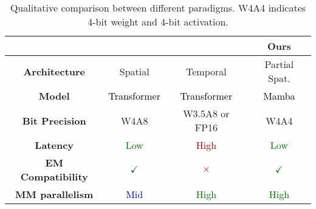 \begin{table}[!t]
\centering
\caption{Qualitative comparison between different paradigms. W4A4 indicates 4-bit weight and 4-bit activation.}
\label{tab:Qualitative comparison}
\begin{tabular}{c|c|c|c}
\toprule
 & \cite{understanding} & \cite{Flightllm}\cite{DFX} & Ours\\
\midrule
\textbf{Architecture} & Spatial & Temporal & Partial Spat. \\
\textbf{Model} & \textcolor{black}{Transformer} & \textcolor{black}{Transformer} & \textcolor{black}{Mamba}\\
\textbf{Bit Precision} & W4A8 & W3.5A8 or FP16 & W4A4 \\
\textbf{Latency} & \textcolor{darkgreen}{Low} & \textcolor{darkred}{High} & \textcolor{darkgreen}{Low}\\
\textbf{EM Compatibility} & \textcolor{darkgreen}{$\checkmark$} & \textcolor{darkred}{$\times$} & \textcolor{darkgreen}{$\checkmark$}\\
\textbf{MM parallelism} & \textcolor{darkblue}{Mid} & \textcolor{darkgreen}{High} & \textcolor{darkgreen}{High}\\


\bottomrule
\end{tabular}
\end{table}



